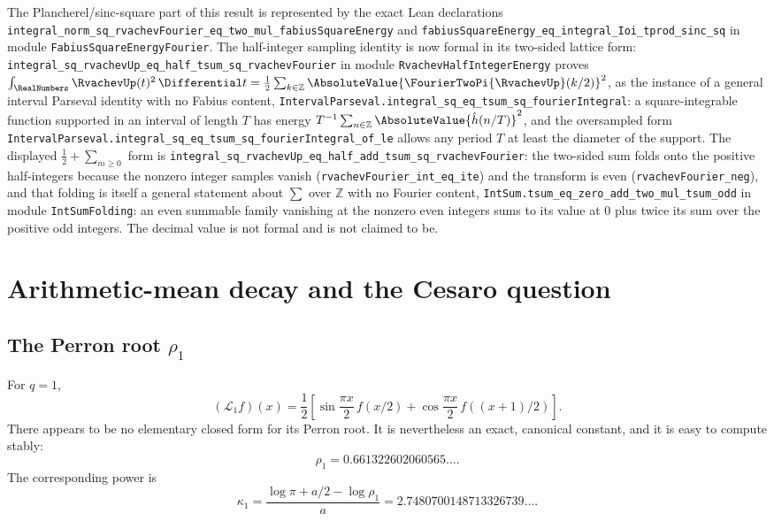\documentclass[11pt,oneside]{article}
\numberwithin{equation}{section}
\theoremstyle{definition}
\theoremstyle{remark}
\newcommand{\lean}[1]{\texttt{#1}}
\newcommand{\decl}[1]{\nolinkurl{#1}}
\begin{document}
The Plancherel/sinc-square part of this result is represented by the exact Lean declarations
\decl{integral_norm_sq_rvachevFourier_eq_two_mul_fabiusSquareEnergy} and
\decl{fabiusSquareEnergy_eq_integral_Ioi_tprod_sinc_sq} in module
\lean{FabiusSquareEnergyFourier}.
The half-integer sampling identity is now formal in its two-sided lattice form:
\decl{integral_sq_rvachevUp_eq_half_tsum_sq_rvachevFourier} in module
\lean{RvachevHalfIntegerEnergy} proves
\(\int_{\RealNumbers}\RvachevUp(t)^2\,\Differential t
=\tfrac12\sum_{k\in\mathbb Z}\AbsoluteValue{\FourierTwoPi{\RvachevUp}(k/2)}^2\),
as the instance of a general interval Parseval identity with no Fabius content,
\decl{IntervalParseval.integral_sq_eq_tsum_sq_fourierIntegral}: a square-integrable
function supported in an interval of length \(T\) has energy
\(T^{-1}\sum_{n\in\mathbb Z}\AbsoluteValue{\hat h(n/T)}^2\), and the oversampled form
\decl{IntervalParseval.integral_sq_eq_tsum_sq_fourierIntegral_of_le} allows any period
\(T\) at least the diameter of the support.  The displayed
\(\tfrac12+\sum_{m\ge0}\) form is
\decl{integral_sq_rvachevUp_eq_half_add_tsum_sq_rvachevFourier}: the two-sided sum
folds onto the positive half-integers because the nonzero integer samples vanish
(\decl{rvachevFourier_int_eq_ite}) and the transform is even
(\decl{rvachevFourier_neg}), and that folding is itself a general statement about
\(\sum\) over \(\mathbb Z\) with no Fourier content,
\decl{IntSum.tsum_eq_zero_add_two_mul_tsum_odd} in module \lean{IntSumFolding}: an
even summable family vanishing at the nonzero even integers sums to its value at
\(0\) plus twice its sum over the positive odd integers.  The decimal value is not
formal and is not claimed to be.

\section{Arithmetic-mean decay and the Cesaro question}
\label{sec:L1-Cesaro}

\subsection{The Perron root \texorpdfstring{$\rho_1$}{rho1}}

For $q=1$,
\begin{equation}
 (\mathcal L_1f)(x)
 =\frac12\left[
  \sin\frac{\pi x}{2}\,f(x/2)
 +\cos\frac{\pi x}{2}\,f((x+1)/2)
 \right].
 \label{eq:L1}
\end{equation}
There appears to be no elementary closed form for its Perron root.  It is nevertheless an
exact, canonical constant, and it is easy to compute stably:
\begin{equation}
 \rho_1=0.661322602060565\ldots .
 \label{eq:rho1-numerical}
\end{equation}
The corresponding power is
\begin{equation}
 \boxed{\displaystyle
 \kappa_1
 =\frac{\log\pi+a/2-\log\rho_1}{a}
 =2.7480700148713326739\ldots .}
 \label{eq:kappa1}
\end{equation}
\end{document}
